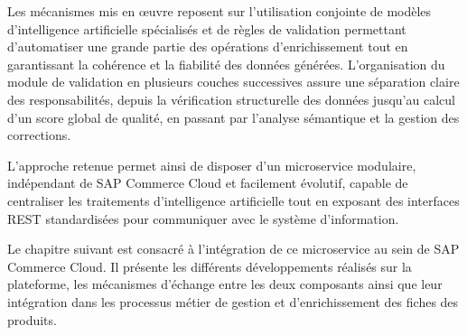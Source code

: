 Les mécanismes mis en œuvre reposent sur l'utilisation conjointe de modèles d'intelligence artificielle spécialisés et de règles de validation permettant d'automatiser une grande partie des opérations d'enrichissement tout en garantissant la cohérence et la fiabilité des données générées. L'organisation du module de validation en plusieurs couches successives assure une séparation claire des responsabilités, depuis la vérification structurelle des données jusqu'au calcul d'un score global de qualité, en passant par l'analyse sémantique et la gestion des corrections.

L'approche retenue permet ainsi de disposer d'un microservice modulaire, indépendant de SAP Commerce Cloud et facilement évolutif, capable de centraliser les traitements d'intelligence artificielle tout en exposant des interfaces REST standardisées pour communiquer avec le système d'information.

Le chapitre suivant est consacré à l'intégration de ce microservice au sein de SAP Commerce Cloud. Il présente les différents développements réalisés sur la plateforme, les mécanismes d'échange entre les deux composants ainsi que leur intégration dans les processus métier de gestion et d'enrichissement des fiches des produits.
